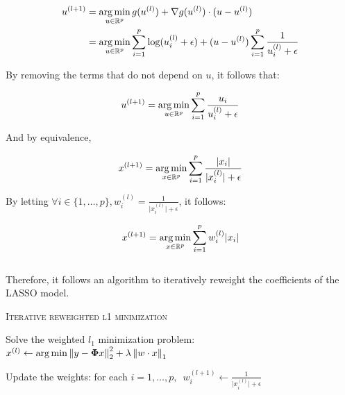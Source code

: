 \documentclass[a4paper,10pt]{article}
\theoremstyle{definition}
\begin{document}
\begin{align*}
    u^{(l+1)} &= \operatorname*{arg\,min}_{u \in \mathbb{R}^p} g(u^{(l)}) + \nabla g(u^{(l)})\cdot (u - u^{(l)}) \\
              &= \operatorname*{arg\,min}_{u \in \mathbb{R}^p} \sum_{i=1}^p \log( u_i^{(l)} + \epsilon) + (u - u^{(l)}) \sum_{i=1}^p \frac{1}{ u_i^{(l)}  + \epsilon}
\end{align*}

By removing the terms that do not depend on $u$, it follows that:

\begin{equation*}
    u^{(l+1)} = \operatorname*{arg\,min}_{u \in \mathbb{R}^p} \sum_{i=1}^p \frac{u_i}{ u_i^{(l)} + \epsilon}
\end{equation*}

And by equivalence,

\begin{equation*}
    x^{(l+1)} = \operatorname*{arg\,min}_{x \in \mathbb{R}^p} \sum_{i=1}^p \frac{\lvert x_i \rvert}{\lvert x_i^{(l)} \rvert + \epsilon}
\end{equation*}

By letting $\forall i \in \{1, \dots, p\}, w_i^{(l)} = \frac{1}{\lvert x_i^{(l)}\rvert + \epsilon}$, it follows:

\begin{equation*}
    x^{(l+1)} = \operatorname*{arg\,min}_{x \in \mathbb{R}^p} \sum_{i=1}^p w_i^{(l)} \lvert x_i \rvert
\end{equation*}
\\
Therefore, it follows an algorithm to iteratively reweight the coefficients of the LASSO model.

\vskip 0.2in

{\fontsize{4}{4}\selectfont
\begin{algorithm}[h]  %
\caption{\textsc{Iterative reweighted l1 minimization}
}
%


    {
        Solve the weighted $l_1$ minimization problem:
        $x^{(l)} \leftarrow \operatorname*{arg\,min} \left \lVert  y -  \mathbf{\Phi} x \right \rVert_2^2 + \lambda \left \lVert  w \cdot x \right \rVert_1$

        Update the weights: for each
        $i = 1, \dots, p, \enspace w_i^{(l+1)} \leftarrow \frac{1}{\lvert x_i^{(l)} \rvert + \epsilon}$
    }

\end{algorithm}
}
\end{document}
